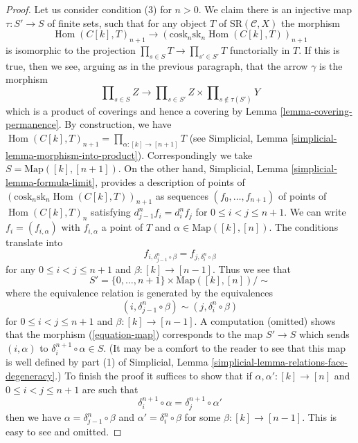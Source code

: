 \documentclass[10pt,a4paper]{amsart}
\theoremstyle{plain}
\theoremstyle{definition}
\theoremstyle{remark}
\numberwithin{equation}{subsection}
\def\Hom{\mathop{\mathrm{Hom}}\nolimits}
\begin{document}
\begin{proof}
\medskip\noindent
Let us consider condition (3) for $n > 0$. We claim there is an
injective map $\tau : S' \to S$ of finite sets, such that for any
object $T$ of $\text{SR}(\mathcal{C}, X)$ the morphism
\begin{equation}
\label{equation-map}
\Hom(C[k], T)_{n + 1} \to
(\text{cosk}_n \text{sk}_n \Hom(C[k], T))_{n + 1}
\end{equation}
is isomorphic to the projection $\prod_{s \in S} T \to \prod_{s' \in S'} T$
functorially in $T$. If this is true, then we see, arguing as in the previous
paragraph, that the arrow $\gamma$ is the morphism
$$
\prod\nolimits_{s \in S} Z
\longrightarrow
\prod\nolimits_{s \in S'} Z
\times
\prod\nolimits_{s \not\in \tau(S')} Y
$$
which is a product of coverings and hence a covering by
Lemma \ref{lemma-covering-permanence}. By construction, we have
$\Hom(C[k], T)_{n + 1} = \prod_{\alpha : [k] \to [n + 1]} T$
(see Simplicial, Lemma \ref{simplicial-lemma-morphism-into-product}).
Correspondingly we take $S = \text{Map}([k], [n + 1])$.
On the other hand, Simplicial, Lemma \ref{simplicial-lemma-formula-limit},
provides a description of points of
$(\text{cosk}_n \text{sk}_n \Hom(C[k], T))_{n + 1}$
as sequences $(f_0, \ldots, f_{n + 1})$ of points of $\Hom(C[k], T)_n$
satisfying $d^n_{j - 1} f_i = d^n_i f_j$ for $0 \leq i < j \leq n + 1$.
We can write $f_i = (f_{i, \alpha})$ with $f_{i, \alpha}$ a point of $T$
and $\alpha \in \text{Map}([k], [n])$. The conditions translate into
$$
f_{i, \delta^n_{j - 1} \circ \beta} = f_{j, \delta_i^n \circ \beta}
$$
for any $0 \leq i < j \leq n + 1$ and $\beta : [k] \to [n - 1]$. Thus we
see that
$$
S' = \{0, \ldots, n + 1\} \times \text{Map}([k], [n]) / \sim
$$
where the equivalence relation is generated by the equivalences
$$
(i, \delta^n_{j - 1} \circ \beta) \sim (j, \delta_i^n \circ \beta)
$$
for $0 \leq i < j \leq n + 1$ and $\beta : [k] \to [n - 1]$.
A computation (omitted) shows that the morphism (\ref{equation-map})
corresponds to the map $S' \to S$ which sends $(i, \alpha)$ to
$\delta^{n + 1}_i \circ \alpha \in S$. (It may be a comfort to the
reader to see that this map is well defined by part (1) of
Simplicial, Lemma \ref{simplicial-lemma-relations-face-degeneracy}.)
To finish the proof it suffices to show that if
$\alpha, \alpha' : [k] \to [n]$ and $0 \leq i < j \leq n + 1$
are such that
$$
\delta^{n + 1}_i \circ \alpha = \delta^{n + 1}_j \circ \alpha'
$$
then we have $\alpha = \delta^n_{j - 1} \circ \beta$
and $\alpha' = \delta_i^n \circ \beta$ for some $\beta : [k] \to [n - 1]$.
This is easy to see and omitted.
\end{proof}
\end{document}
